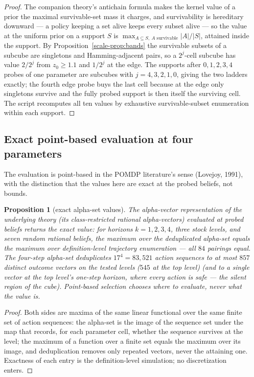 \documentclass[10pt,twocolumn]{article}
\theoremstyle{plain}
\newtheorem{proposition}[theorem]{Proposition}
\theoremstyle{definition}
\theoremstyle{remark}
\begin{document}
\begin{proof}
The companion theory's antichain formula makes the kernel value of a
prior the maximal survivable-set mass it charges, and survivability is
hereditary downward --- a policy keeping a set alive keeps every
subset alive --- so the value at the uniform prior on a support
\(S\) is \(\max_{A \subseteq S,\ A
\text{ survivable}} |A|/|S|\), attained inside the support. By
Proposition~\ref{scale-prop:bands} the survivable subsets of a subcube are
singletons and Hamming-adjacent pairs, so a \(2^{j}\)-cell subcube
has value \(2/2^{j}\) from \(z_{0} \ge 1.1\) and \(1/2^{j}\) at
the edge. The supports after \(0, 1, 2, 3, 4\) probes of one
parameter are subcubes with \(j = 4, 3, 2, 1, 0\), giving the two
ladders exactly; the fourth edge probe buys the last cell because at
the edge only singletons survive and the fully probed support is then
itself the surviving cell. The script recomputes all ten values by
exhaustive survivable-subset enumeration within each support.
\end{proof}

\subsection{Exact point-based evaluation at four parameters}
\label{scale-pbvi}

The evaluation is point-based in the POMDP literature's sense
(Lovejoy, 1991), with the distinction that the values here are exact at
the probed beliefs, not bounds.

\begin{proposition}[exact alpha-set values]\label{scale-prop:pbvi}
The alpha-vector representation of the underlying theory (its
class-restricted rational alpha-vectors) evaluated at probed beliefs
returns the exact value: for horizons \(k = 1, 2, 3, 4\), three stock
levels, and seven random rational beliefs, the maximum over the
deduplicated alpha-set equals the maximum over definition-level
trajectory enumeration --- all \(84\) pairings equal. The four-step
alpha-set deduplicates \(17^{4} = 83{,}521\) action sequences to at most \(857\) distinct outcome vectors on the tested levels
(\(545\) at the top level) (and to a single
vector at the top level's one-step horizon, where every action is
safe --- the silent region of the cube). Point-based selection
chooses where to evaluate, never what the value is.
\end{proposition}

\begin{proof}
Both sides are maxima of the same linear functional over the same
finite set of action sequences: the alpha-set is the image of the
sequence set under the map that records, for each parameter cell,
whether the sequence survives at the level; the maximum of a function
over a finite set equals the maximum over its image, and
deduplication removes only repeated vectors, never the attaining one.
Exactness of each entry is the definition-level simulation; no
discretization enters.
\end{proof}
\end{document}

